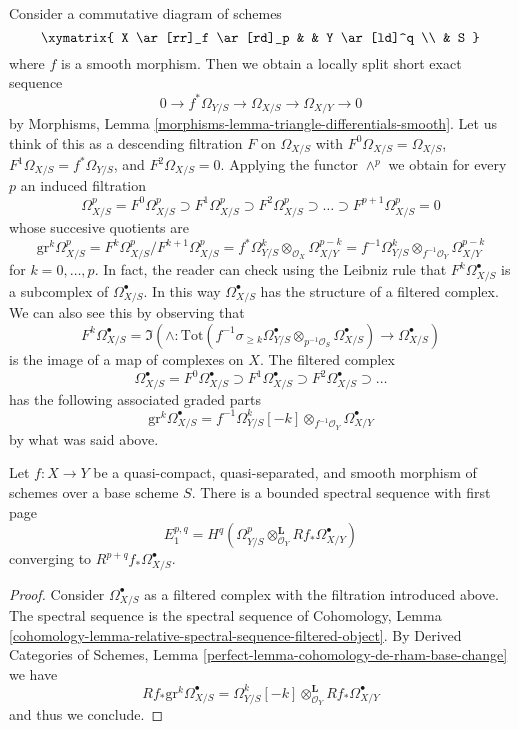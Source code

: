 \noindent
Consider a commutative diagram of schemes
$$
\xymatrix{
X \ar[rr]_f \ar[rd]_p & & Y \ar[ld]^q \\
& S
}
$$
where $f$ is a smooth morphism. Then we obtain a locally split short
exact sequence
$$
0 \to f^*\Omega_{Y/S} \to \Omega_{X/S} \to \Omega_{X/Y} \to 0
$$
by Morphisms, Lemma \ref{morphisms-lemma-triangle-differentials-smooth}.
Let us think of this as a descending filtration $F$ on $\Omega_{X/S}$
with $F^0\Omega_{X/S} = \Omega_{X/S}$, $F^1\Omega_{X/S} = f^*\Omega_{Y/S}$, and
$F^2\Omega_{X/S} = 0$. Applying the functor $\wedge^p$ we obtain
for every $p$ an induced filtration
$$
\Omega^p_{X/S} = F^0\Omega^p_{X/S} \supset
F^1\Omega^p_{X/S} \supset
F^2\Omega^p_{X/S} \supset \ldots \supset F^{p + 1}\Omega^p_{X/S} = 0
$$
whose succesive quotients are
$$
\text{gr}^k\Omega^p_{X/S} =
F^k\Omega^p_{X/S}/F^{k + 1}\Omega^p_{X/S} =
f^*\Omega^k_{Y/S} \otimes_{\mathcal{O}_X} \Omega^{p - k}_{X/Y} =
f^{-1}\Omega^k_{Y/S} \otimes_{f^{-1}\mathcal{O}_Y} \Omega^{p - k}_{X/Y}
$$
for $k = 0, \ldots, p$. In fact, the reader can check using the
Leibniz rule that $F^k\Omega^\bullet_{X/S}$ is a subcomplex of
$\Omega^\bullet_{X/S}$. In this way $\Omega^\bullet_{X/S}$ has
the structure of a filtered complex. We can also see this by observing
that
$$
F^k\Omega^\bullet_{X/S} =
\Im\left(\wedge :
\text{Tot}(
f^{-1}\sigma_{\geq k}\Omega^\bullet_{Y/S} \otimes_{p^{-1}\mathcal{O}_S}
\Omega^\bullet_{X/S})
\longrightarrow
\Omega^\bullet_{X/S}\right)
$$
is the image of a map of complexes on $X$. The filtered complex
$$
\Omega^\bullet_{X/S} = F^0\Omega^\bullet_{X/S} \supset
F^1\Omega^\bullet_{X/S} \supset F^2\Omega^\bullet_{X/S} \supset \ldots
$$
has the following associated graded parts
$$
\text{gr}^k\Omega^\bullet_{X/S} = 
f^{-1}\Omega^k_{Y/S}[-k] \otimes_{f^{-1}\mathcal{O}_Y} \Omega^\bullet_{X/Y}
$$
by what was said above.

\begin{lemma}
\label{lemma-spectral-sequence-smooth}
Let $f : X \to Y$ be a quasi-compact, quasi-separated, and smooth
morphism of schemes over a base scheme $S$. There is a bounded spectral
sequence with first page
$$
E_1^{p, q} =
H^q(\Omega^p_{Y/S} \otimes_{\mathcal{O}_Y}^\mathbf{L} Rf_*\Omega^\bullet_{X/Y})
$$
converging to $R^{p + q}f_*\Omega^\bullet_{X/S}$.
\end{lemma}

\begin{proof}
Consider $\Omega^\bullet_{X/S}$ as a filtered complex with the
filtration introduced above. The spectral sequence is the
spectral sequence of Cohomology, Lemma
\ref{cohomology-lemma-relative-spectral-sequence-filtered-object}.
By Derived Categories of Schemes, Lemma
\ref{perfect-lemma-cohomology-de-rham-base-change} we have
$$
Rf_*\text{gr}^k\Omega^\bullet_{X/S} =
\Omega^k_{Y/S}[-k] \otimes_{\mathcal{O}_Y}^\mathbf{L} Rf_*\Omega^\bullet_{X/Y}
$$
and thus we conclude.
\end{proof}

